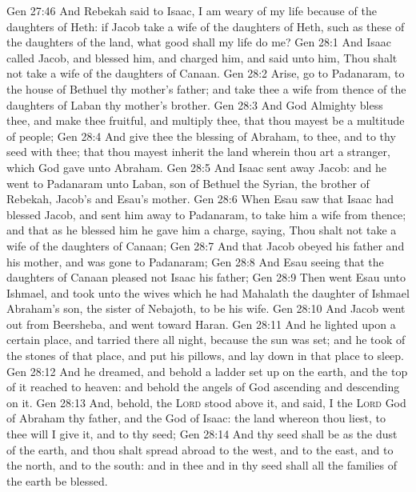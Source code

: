\vs Gen 27:46 And Rebekah said to Isaac, I am weary of my life because of the daughters of Heth: if Jacob take a wife of the daughters of Heth, such as these  of the daughters of the land, what good shall my life do me?
\vs Gen 28:1 And Isaac called Jacob, and blessed him, and charged him, and said unto him, Thou shalt not take a wife of the daughters of Canaan.
\vs Gen 28:2 Arise, go to Padanaram, to the house of Bethuel thy mother's father; and take thee a wife from thence of the daughters of Laban thy mother's brother.
\vs Gen 28:3 And God Almighty bless thee, and make thee fruitful, and multiply thee, that thou mayest be a multitude of people;
\vs Gen 28:4 And give thee the blessing of Abraham, to thee, and to thy seed with thee; that thou mayest inherit the land wherein thou art a stranger, which God gave unto Abraham.
\vs Gen 28:5 And Isaac sent away Jacob: and he went to Padanaram unto Laban, son of Bethuel the Syrian, the brother of Rebekah, Jacob's and Esau's mother.
\vs Gen 28:6 When Esau saw that Isaac had blessed Jacob, and sent him away to Padanaram, to take him a wife from thence; and that as he blessed him he gave him a charge, saying, Thou shalt not take a wife of the daughters of Canaan;
\vs Gen 28:7 And that Jacob obeyed his father and his mother, and was gone to Padanaram;
\vs Gen 28:8 And Esau seeing that the daughters of Canaan pleased not Isaac his father;
\vs Gen 28:9 Then went Esau unto Ishmael, and took unto the wives which he had Mahalath the daughter of Ishmael Abraham's son, the sister of Nebajoth, to be his wife.
\vs Gen 28:10 And Jacob went out from Beersheba, and went toward Haran.
\vs Gen 28:11 And he lighted upon a certain place, and tarried there all night, because the sun was set; and he took of the stones of that place, and put  his pillows, and lay down in that place to sleep.
\vs Gen 28:12 And he dreamed, and behold a ladder set up on the earth, and the top of it reached to heaven: and behold the angels of God ascending and descending on it.
\vs Gen 28:13 And, behold, the \textsc{Lord} stood above it, and said, I  the \textsc{Lord} God of Abraham thy father, and the God of Isaac: the land whereon thou liest, to thee will I give it, and to thy seed;
\vs Gen 28:14 And thy seed shall be as the dust of the earth, and thou shalt spread abroad to the west, and to the east, and to the north, and to the south: and in thee and in thy seed shall all the families of the earth be blessed.
